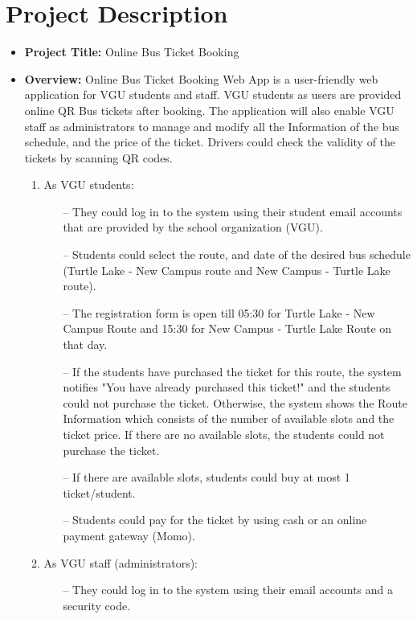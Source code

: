 \section{Project Description}

\begin{itemize}
    \item \textbf{Project Title:} Online Bus Ticket Booking
    
    \item \textbf{Overview:} Online Bus Ticket Booking Web App is a user-friendly web application for VGU students and staff. VGU students as users are provided online QR Bus tickets after booking. The application will also enable VGU staff as administrators to manage and modify all the Information of the bus schedule, and the price of the ticket. Drivers could check the validity of the tickets by scanning QR codes. 

    \begin{enumerate}
        \item As VGU students:
    \begin{enumerate}
        \item[--] They could log in to the system using their student email accounts that are provided by the school organization (VGU).
        \item[--] Students could select the route, and date of the desired bus schedule (Turtle Lake - New Campus route and New Campus - Turtle Lake route).
        \item[--] The registration form is open till 05:30 for Turtle Lake - New Campus Route and 15:30 for New Campus - Turtle Lake Route on that day.
        \item[--] If the students have purchased the ticket for this route, the system notifies "You have already purchased this ticket!" and the students could not purchase the ticket. Otherwise, the system shows the Route Information which consists of the number of available slots and the ticket price. If there are no available slots, the students could not purchase the ticket. 
        \item[--] If there are available slots, students could buy at most 1 ticket/student.
        \item[--] Students could pay for the ticket by using cash or an online payment gateway (Momo).
    \end{enumerate}

        \item As VGU staff (administrators):
    \begin{enumerate}
        \item[--] They could log in to the system using their email accounts and a security code.


\end{enumerate}
\end{enumerate}
\end{itemize}
